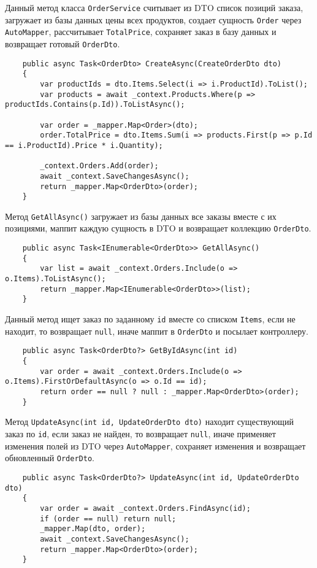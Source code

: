 \documentclass[a4paper,12pt]{report}
\begin{document}
Данный метод класса \texttt{OrderService} считывает из \acs{DTO} список позиций заказа, 
загружает из базы данных цены всех продуктов, создает сущность \texttt{Order} через \texttt{AutoMapper}, 
рассчитывает \texttt{TotalPrice}, сохраняет заказ в базу данных и возвращает готовый \texttt{OrderDto}.
\begin{verbatim}
    public async Task<OrderDto> CreateAsync(CreateOrderDto dto)
    {
        var productIds = dto.Items.Select(i => i.ProductId).ToList();
        var products = await _context.Products.Where(p => productIds.Contains(p.Id)).ToListAsync();

        var order = _mapper.Map<Order>(dto);
        order.TotalPrice = dto.Items.Sum(i => products.First(p => p.Id == i.ProductId).Price * i.Quantity);

        _context.Orders.Add(order);
        await _context.SaveChangesAsync();
        return _mapper.Map<OrderDto>(order);
    }
\end{verbatim}

Метод \texttt{GetAllAsync()} загружает из базы данных все заказы вместе с их позициями, 
маппит каждую сущность в \acs{DTO} и возвращает коллекцию \texttt{OrderDto}.
\begin{verbatim}
    public async Task<IEnumerable<OrderDto>> GetAllAsync()
    {
        var list = await _context.Orders.Include(o => o.Items).ToListAsync();
        return _mapper.Map<IEnumerable<OrderDto>>(list);
    }
\end{verbatim}

Данный метод ищет заказ по заданному \texttt{id} вместе со списком \texttt{Items}, 
если не находит, то возвращает \texttt{null}, иначе маппит в \texttt{OrderDto} и посылает контроллеру.
\begin{verbatim}
    public async Task<OrderDto?> GetByIdAsync(int id)
    {
        var order = await _context.Orders.Include(o => o.Items).FirstOrDefaultAsync(o => o.Id == id);
        return order == null ? null : _mapper.Map<OrderDto>(order);
    }
\end{verbatim}

Метод \texttt{UpdateAsync(int id, UpdateOrderDto dto)} находит существующий заказ по \texttt{id}, 
если заказ не найден, то возвращает \texttt{null}, иначе применяет изменения полей из \acs{DTO} через \texttt{AutoMapper}, 
сохраняет изменения и возвращает обновленный \texttt{OrderDto}.
\begin{verbatim}
    public async Task<OrderDto?> UpdateAsync(int id, UpdateOrderDto dto)
    {
        var order = await _context.Orders.FindAsync(id);
        if (order == null) return null;
        _mapper.Map(dto, order);
        await _context.SaveChangesAsync();
        return _mapper.Map<OrderDto>(order);
    }
\end{verbatim}
\end{document}
